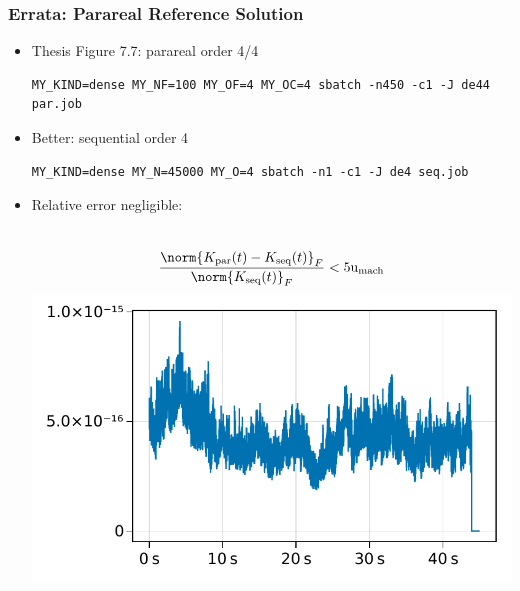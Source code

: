 \begin{frame}[fragile]
  \frametitle{Errata: Parareal Reference Solution}
  \begin{itemize}
    \item
      Thesis Figure 7.7: parareal order 4/4
      \hyperlink{fig:7.7}{}

      \begin{lstlisting}
MY_KIND=dense MY_NF=100 MY_OF=4 MY_OC=4 sbatch -n450 -c1 -J de44 par.job
      \end{lstlisting}
    \item
      Better: sequential order 4

      \begin{lstlisting}
MY_KIND=dense MY_N=45000 MY_O=4 sbatch -n1 -c1 -J de4 seq.job
      \end{lstlisting}
    \item
      Relative error negligible:
      \begin{minipage}{\linewidth}
      \begin{columns}[totalwidth=\linewidth]
        \begin{equation*}
          \frac{\norm{K_\text{par}(t) - K_\text{seq}(t)}_F}{\norm{K_\text{seq}(t)}_F}
          < 5\umach
        \end{equation*}
        \includegraphics[width=\textwidth]{figures/slides-seq-parareal-ref.pdf}
      \end{columns}
      \end{minipage}
  \end{itemize}
\end{frame}


